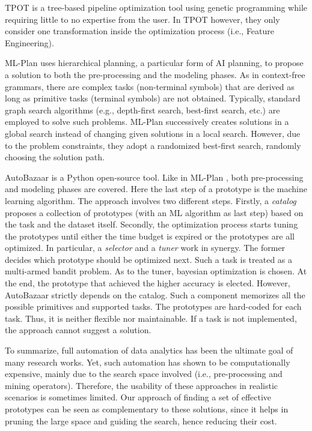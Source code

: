 TPOT \cite{Olson16Tpot} is a tree-based pipeline optimization tool using genetic programming while requiring little to no expertise from the user.
In TPOT however, they only consider one transformation inside the optimization process (i.e., Feature Engineering).

ML-Plan \cite{mohr2018ml} uses hierarchical planning, a particular form of AI planning, to propose a solution to both the pre-processing and the modeling phases.
As in context-free grammars, there are complex tasks (non-terminal symbols) that are derived as long as primitive tasks (terminal symbols) are not obtained.
Typically, standard graph search algorithms (e.g., depth-first search, best-first search, etc.) are employed to solve such problems.
ML-Plan successively creates solutions in a global search instead of changing given solutions in a local search. However, due to the problem constraints, they adopt a randomized best-first search, randomly choosing the solution path.

AutoBazaar \cite{AutoBazaar} is a Python open-source tool.
Like in ML-Plan \cite{mohr2018ml}, both pre-processing and modeling phases are covered.
Here the last step of a prototype is the machine learning algorithm.
The approach involves two different steps.
Firstly, a \textit{catalog} proposes a collection of prototypes (with an ML algorithm as last step) based on the task and the dataset itself.
Secondly, the optimization process starts tuning the prototypes until either the time budget is expired or the prototypes are all optimized.
In particular, a \textit{selector} and a \textit{tuner} work in synergy.
The former decides which prototype should be optimized next.
Such a task is treated as a multi-armed bandit problem.
As to the tuner, bayesian optimization is chosen.
At the end, the prototype that achieved the higher accuracy is elected.
However, AutoBazaar strictly depends on the catalog.
Such a component memorizes all the possible primitives and supported tasks.
The prototypes are hard-coded for each task.
Thus, it is neither flexible nor maintainable.
If a task is not implemented, the approach cannot suggest a solution.

To summarize, full automation of data analytics has been the ultimate goal of many research works.
Yet, such automation has shown to be computationally expensive, mainly due to the search space involved (i.e., pre-processing and mining operators).
Therefore, the usability of these approaches in realistic scenarios is sometimes limited.
Our approach of finding a set of effective prototypes can be seen as complementary to these solutions, since it helps in pruning the large space and guiding the search, hence reducing their cost.

